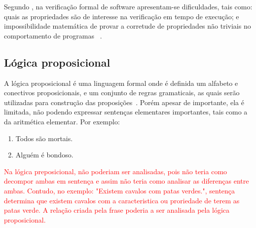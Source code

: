 Segundo \citeauthor{rocha2015verificaccao}, na verificação formal de software apresentam-se dificuldades, tais como: quais as propriedades são de interesse na verificação em tempo de execução; e impossibilidade matemática de provar a corretude de propriedades não triviais no comportamento de programas 
~\cite{cousot2010gentle}. 

\subsection{Lógica proposicional}

A lógica proposicional é uma linguagem formal onde é definida um alfabeto e conectivos proposicionais, e um conjunto de regras gramaticais, as quais serão utilizadas para construção das proposições~\cite{souza2017logica}. Porém apesar de importante, ela é limitada, não podendo expressar sentenças elementares importantes, tais como a da aritmética elementar. Por exemplo:
\begin{enumerate}
\item Todos são mortais.
\item Alguém é bondoso.
\end{enumerate}

\textcolor{red}{Na lógica preposicional, não poderiam ser analisadas, pois não teria como decompor ambas em sentença e assim não teria como analisar as diferenças entre ambas. Contudo, no exemplo: "Existem cavalos com patas verdes.", sentença determina que existem cavalos com a caracteristica ou proriedade de terem as patas verde. A relação criada pela frase poderia a ser analisada pela lógica proposicional\cite{abe2002introducao}.}


